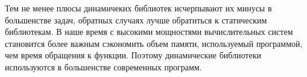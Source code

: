\documentclass[pdf, unicode, 12pt, a4paper,oneside,fleqn]{article}
\begin{document}
Тем не менее плюсы динамичеких библиотек исчерпывают их минусы в большенстве задач, 
обратных случаях лучше обратиться к статическим библиотекам. В наше время с высокими мощностями 
вычислительных систем становится более важным сэкономить объем памяти, используемый программой,
чем время обращения к функции. Поэтому динамические библиотеки используются в большенстве 
современных программ.
\end{document}

